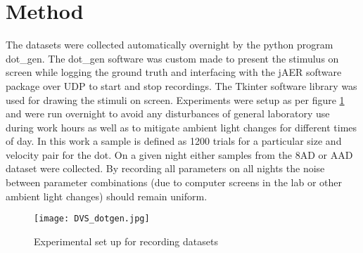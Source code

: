 \section{Method}
The datasets were collected automatically overnight by the python program dot\_gen. 
The dot\_gen software was custom made to present the stimulus on screen while logging the ground truth and interfacing with the jAER software package over UDP to start and stop recordings. 
The Tkinter software library was used for drawing the stimuli on screen. 
Experiments were setup as per figure \ref{fig:DVSdotgen} and were run overnight to avoid any disturbances of general laboratory use during work hours as well as to mitigate ambient light changes for different times of day. 
In this work a sample is defined as 1200 trials for a particular size and velocity pair for the dot.
On a given night either samples from the 8AD or AAD dataset were collected. 
By recording all parameters on all nights the noise between parameter combinations (due to computer screens in the lab or other ambient light changes) should remain uniform.

\begin{figure}
    \centering
    \texttt{[image: DVS\_dotgen.jpg]}
    \caption{Experimental set up for recording datasets}
    \label{fig:DVSdotgen}
\end{figure}




